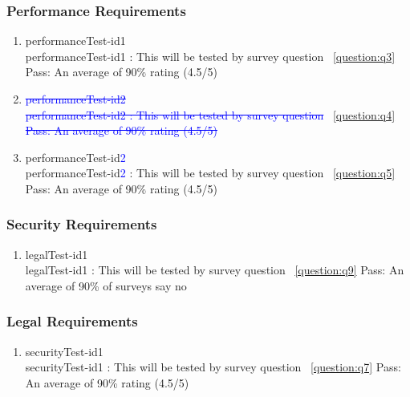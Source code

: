 \documentclass[12pt, titlepage]{article}
\begin{document}
\subsubsection{Performance Requirements}
\begin{enumerate}
\item{performanceTest-id1\\}
performanceTest-id1 : This will be tested by survey question ~\ref{question:q3}
\newline
	Pass: An average of 90\% rating (4.5/5)


\item{\textcolor{blue}{\st{performanceTest-id2}}\\}
\textcolor{blue}{\st{performanceTest-id2 : This will be tested by survey question}} ~\ref{question:q4}
\newline
	\textcolor{blue}{\st{Pass: An average of 90\% rating (4.5/5)}}

\item{performanceTest-id\textcolor{blue}{2}\\}
performanceTest-id\textcolor{blue}{2} : This will be tested by survey question ~\ref{question:q5}
\newline
	Pass: An average of 90\% rating (4.5/5)


\end{enumerate}

\subsubsection{Security Requirements}
\begin{enumerate}
\item{legalTest-id1\\}
legalTest-id1 : This will be tested by survey question ~\ref{question:q9}
\newline
	Pass: An average of 90\% of surveys say no

\end{enumerate}

\subsubsection{ Legal Requirements}
\begin{enumerate}
\item{securityTest-id1\\}
securityTest-id1 : This will be tested by survey question ~\ref{question:q7}
\newline
	Pass: An average of 90\% rating (4.5/5)


\end{enumerate}
\end{document}
